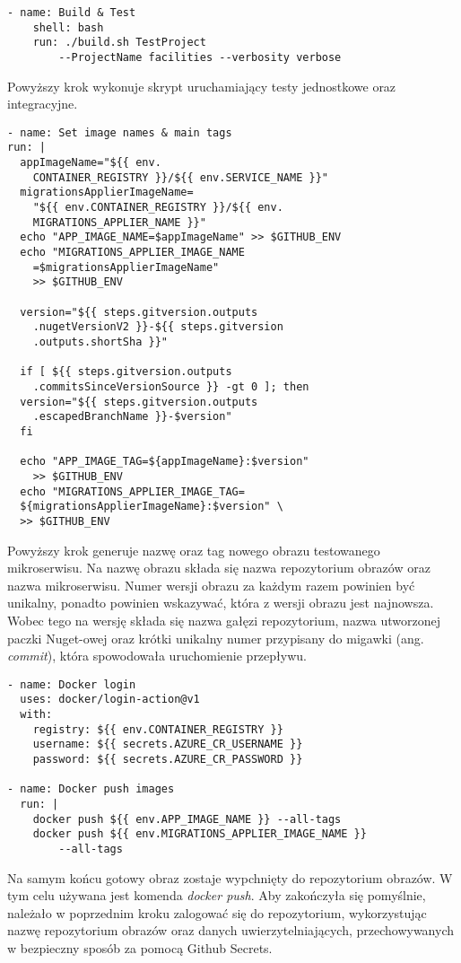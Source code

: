 \begin{lstlisting}
- name: Build & Test
    shell: bash
    run: ./build.sh TestProject 
        --ProjectName facilities --verbosity verbose
\end{lstlisting}

Powyższy krok wykonuje skrypt uruchamiający testy jednostkowe oraz integracyjne.

\begin{lstlisting}
- name: Set image names & main tags
run: |
  appImageName="${{ env.
    CONTAINER_REGISTRY }}/${{ env.SERVICE_NAME }}"
  migrationsApplierImageName=
    "${{ env.CONTAINER_REGISTRY }}/${{ env.
    MIGRATIONS_APPLIER_NAME }}"
  echo "APP_IMAGE_NAME=$appImageName" >> $GITHUB_ENV
  echo "MIGRATIONS_APPLIER_IMAGE_NAME
    =$migrationsApplierImageName" 
    >> $GITHUB_ENV

  version="${{ steps.gitversion.outputs
    .nugetVersionV2 }}-${{ steps.gitversion
    .outputs.shortSha }}"

  if [ ${{ steps.gitversion.outputs
    .commitsSinceVersionSource }} -gt 0 ]; then
  version="${{ steps.gitversion.outputs
    .escapedBranchName }}-$version"
  fi

  echo "APP_IMAGE_TAG=${appImageName}:$version" 
    >> $GITHUB_ENV
  echo "MIGRATIONS_APPLIER_IMAGE_TAG=
  ${migrationsApplierImageName}:$version" \
  >> $GITHUB_ENV
\end{lstlisting}

Powyższy krok generuje nazwę oraz tag nowego obrazu testowanego mikroserwisu. Na nazwę 
obrazu składa się nazwa repozytorium obrazów oraz nazwa mikroserwisu. Numer wersji 
obrazu za każdym razem powinien być unikalny, ponadto powinien wskazywać, która z 
wersji obrazu jest najnowsza. Wobec tego na wersję składa się nazwa gałęzi 
repozytorium, nazwa utworzonej paczki Nuget-owej oraz krótki unikalny numer przypisany 
do migawki (ang. \textit{commit}), która spowodowała uruchomienie przepływu.

\begin{lstlisting}
- name: Docker login
  uses: docker/login-action@v1
  with:
    registry: ${{ env.CONTAINER_REGISTRY }}
    username: ${{ secrets.AZURE_CR_USERNAME }}
    password: ${{ secrets.AZURE_CR_PASSWORD }}

- name: Docker push images
  run: |
    docker push ${{ env.APP_IMAGE_NAME }} --all-tags
    docker push ${{ env.MIGRATIONS_APPLIER_IMAGE_NAME }} 
        --all-tags
\end{lstlisting}

Na samym końcu gotowy obraz zostaje wypchnięty do repozytorium obrazów. W tym celu 
używana jest komenda \textit{docker push}. Aby zakończyła się pomyślnie, należało 
w poprzednim kroku zalogować się do repozytorium, wykorzystując nazwę repozytorium obrazów oraz 
danych uwierzytelniających, przechowywanych w bezpieczny sposób za pomocą Github 
Secrets.


